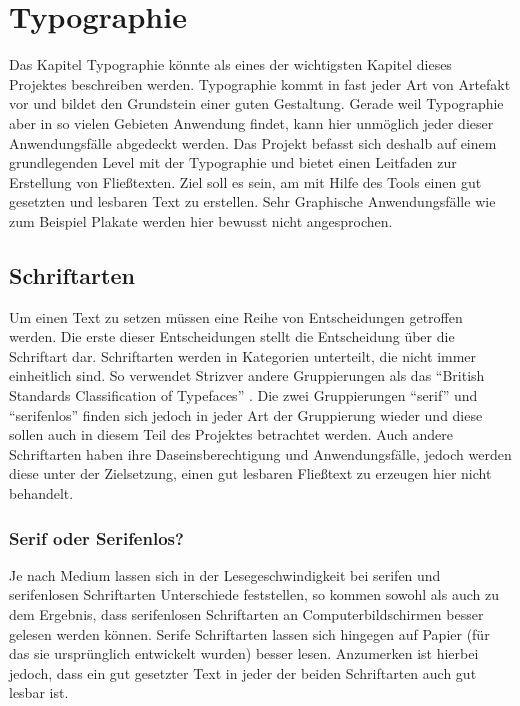 
\newcommand{\chaptertitle}{Typographie}

\chapter{\chaptertitle} %

\label{Typographie} %

\lhead{\chaptername{} \thechapter{} - \emph{\chaptertitle}} %


Das Kapitel Typographie könnte als eines der wichtigsten Kapitel dieses Projektes beschreiben werden. Typographie kommt in fast jeder Art von Artefakt vor und bildet den Grundstein einer guten Gestaltung. Gerade weil Typographie aber in so vielen Gebieten Anwendung findet, kann hier unmöglich jeder dieser Anwendungsfälle abgedeckt werden.
Das Projekt befasst sich deshalb auf einem grundlegenden Level mit der Typographie und bietet einen Leitfaden zur Erstellung von Fließtexten. Ziel soll es sein, am mit Hilfe des Tools einen gut gesetzten und lesbaren Text zu erstellen.
Sehr Graphische Anwendungsfälle wie zum Beispiel Plakate werden hier bewusst nicht angesprochen.

\section{Schriftarten}
Um einen Text zu setzen müssen eine Reihe von Entscheidungen getroffen werden. Die erste dieser Entscheidungen stellt die Entscheidung über die Schriftart dar.
Schriftarten werden in Kategorien unterteilt, die nicht immer einheitlich sind. So verwendet Strizver \cite{strizver2014type} andere Gruppierungen als  das “British Standards Classification of Typefaces” \cite[S. 51]{baines2005type}. Die zwei Gruppierungen “serif” und “serifenlos” finden sich jedoch in jeder Art der Gruppierung wieder und diese sollen auch in diesem Teil des Projektes betrachtet werden.
Auch andere Schriftarten haben ihre Daseinsberechtigung und Anwendungsfälle, jedoch werden diese unter der Zielsetzung, einen gut lesbaren Fließtext zu erzeugen hier nicht behandelt.

\subsection{Serif oder Serifenlos?}
Je nach Medium lassen sich in der Lesegeschwindigkeit bei serifen und serifenlosen Schriftarten Unterschiede feststellen, so kommen sowohl \cite{josephson2008keeping} als auch \cite{dogusoy2016serif} zu dem Ergebnis, dass serifenlosen Schriftarten an Computerbildschirmen besser gelesen werden können. Serife Schriftarten lassen sich hingegen auf Papier (für das sie ursprünglich entwickelt wurden) besser lesen.
Anzumerken ist hierbei jedoch, dass ein gut gesetzter Text in jeder der beiden Schriftarten auch gut lesbar ist.

